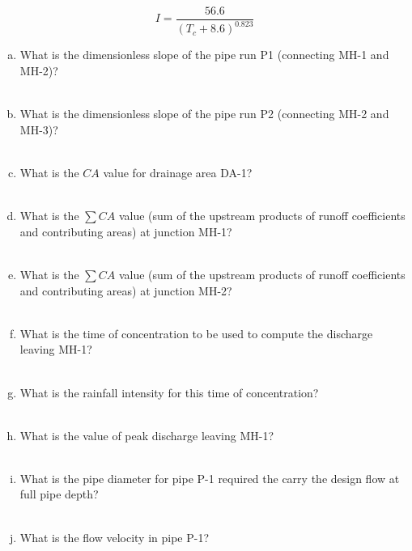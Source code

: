 \documentclass[12pt]{article}
\begin{document}
\begin{enumerate}
\begin{equation}
I = \frac{56.6}{(T_c + 8.6)^{0.823}}
\label{eqn:intensity1}
\end{equation}

\begin{enumerate}[a)]
\item What is the dimensionless slope of the pipe run P1 (connecting MH-1 and MH-2)? ~\\~\\
\item What is the dimensionless slope of the pipe run P2 (connecting MH-2 and MH-3)?  ~\\~\\
\item What is the $CA$ value for drainage area DA-1?  ~\\~\\
\item What is the $\sum{CA}$ value (sum of the upstream products of runoff coefficients and contributing areas) at junction MH-1?  ~\\~\\
\item What is the $\sum{CA}$ value (sum of the upstream products of runoff coefficients and contributing areas) at junction MH-2?  ~\\~\\
\item What is the time of concentration to be used to compute the discharge leaving MH-1?  ~\\~\\
\item What is the rainfall intensity for this time of concentration?  ~\\~\\
\item What is the value of peak discharge leaving MH-1?  ~\\~\\
\item What is the pipe diameter for pipe P-1 required the carry the design flow at full pipe depth?  ~\\~\\
\item What is the flow velocity in pipe P-1?  ~\\~\\

\end{enumerate}
\end{enumerate}
\end{document}
